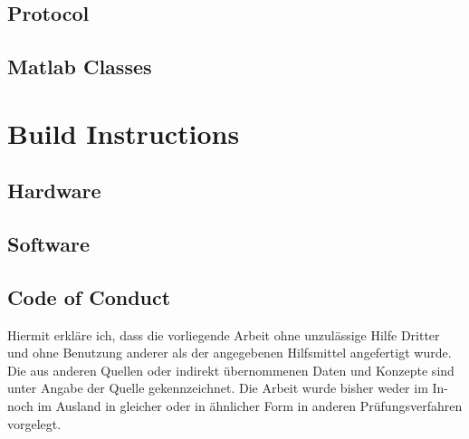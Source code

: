 \documentclass[12pt,a4paper,parskip=full,abstract=true,BCOR=12mm,twoside,open=right]{scrreprt}
\begin{document}
\section{Protocol}
\section{Matlab Classes}
\chapter{Build Instructions}
\section{Hardware}
\section{Software}

\printglossary[type=\acronymtype]

\listoffigures




\begin{otherlanguage}{ngerman}
    \chapter*{Code of Conduct}
    Hiermit erkl\"are ich, dass die vorliegende Arbeit ohne unzul\"assige Hilfe Dritter und ohne Benutzung
    anderer als der angegebenen Hilfsmittel angefertigt wurde. Die aus anderen Quellen oder indirekt
    \"ubernommenen Daten und Konzepte sind unter Angabe der Quelle gekennzeichnet.
    Die Arbeit wurde bisher weder im In- noch im Ausland in gleicher oder in \"ahnlicher Form in anderen
    Pr\"ufungsverfahren vorgelegt.

    \par\noindent\makebox[7cm]{\hrulefill}      \hfill\makebox[5cm]{\hrulefill}%
    \par\noindent{} \hfill{}%
\end{otherlanguage}
\end{document}
